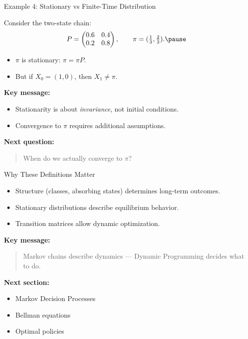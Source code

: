 \documentclass[aspectratio=169]{beamer}
\begin{document}
\begin{frame}{Example 4: Stationary vs Finite-Time Distribution}

Consider the two-state chain:
\[
P=
\begin{pmatrix}
0.6 & 0.4\\
0.2 & 0.8
\end{pmatrix},
\qquad
\pi=(\tfrac13,\tfrac23).\pause
\]

\begin{itemize}
  \item $\pi$ is stationary: $\pi=\pi P$.\pause
  \item But if $X_0=(1,0)$, then $X_1 \neq \pi$.\pause
\end{itemize}

\medskip
\textbf{Key message:}
\begin{itemize}
  \item Stationarity is about \emph{invariance}, not initial conditions.\pause
  \item Convergence to $\pi$ requires additional assumptions.\pause
\end{itemize}

\medskip
\textbf{Next question:}
\begin{quote}
When do we actually converge to $\pi$?
\end{quote}

\end{frame}





\begin{frame}{Why These Definitions Matter}

\begin{itemize}
  \item Structure (classes, absorbing states) determines long-term outcomes.\pause
  \item Stationary distributions describe equilibrium behavior.\pause
  \item Transition matrices allow dynamic optimization.\pause
\end{itemize}

\medskip
\textbf{Key message:}
\begin{quote}
Markov chains describe dynamics —  
Dynamic Programming decides what to do.\pause
\end{quote}

\medskip
\textbf{Next section:}
\begin{itemize}
  \item Markov Decision Processes\pause
  \item Bellman equations\pause
  \item Optimal policies
\end{itemize}
\end{frame}
\end{document}
